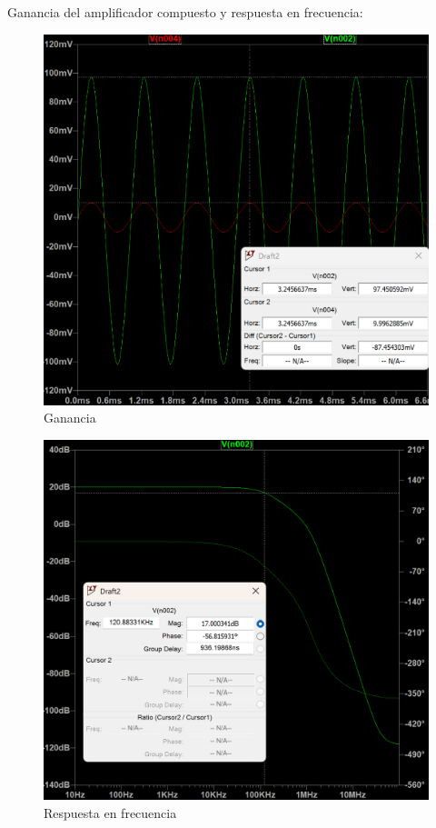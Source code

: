 \documentclass[a4paper,12pt]{article}
\begin{document}
\hspace{1mm} Ganancia del amplificador compuesto y respuesta en frecuencia:
\begin{figure}
    \centering
    \includegraphics[width=0.7\linewidth]{Vin-Vout_VFA-VFA.png}
    \caption{Ganancia}
    \label{fig:enter-label}
\end{figure}
\begin{figure}
    \centering
    \includegraphics[width=0.7\linewidth]{RTAenF_VFA-VFA.png}
    \caption{Respuesta en frecuencia}
    \label{fig:enter-label}
\end{figure}
\newpage
\end{document}
